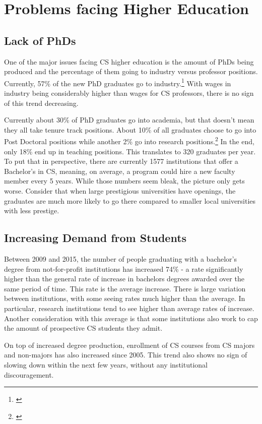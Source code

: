 \documentclass[12pt,twoside]{reedthesis}
\begin{document}
\section{Problems facing Higher Education}

\subsection{Lack of PhDs}
One of the major issues facing CS higher education is the amount of PhDs being produced and the percentage of them going to industry versus professor positions. Currently, 57\% of the new PhD graduates go to industry.\footnote{\cite{zweben_another_2018}} With wages in industry being considerably higher than wages for CS professors, there is no sign of this trend decreasing. 

Currently about 30\% of PhD graduates go into academia, but that doesn't mean they all take tenure track positions. About 10\% of all graduates choose to go into Post Doctoral positions while another 2\% go into research positions.\footnote{\cite{zweben_another_2018}} In the end, only 18\% end up in teaching positions. This translates to 320 graduates per year. To put that in perspective, there are currently 1577 institutions that offer a Bachelor's in CS, meaning, on average, a program could hire a new faculty member every 5 years. While those numbers seem bleak, the picture only gets worse. Consider that when large prestigious universities have openings, the graduates are much more likely to go there compared to smaller local universities with less prestige. 

\subsection{Increasing Demand from Students}
Between 2009 and 2015, the number of people graduating with a bachelor's degree from not-for-profit institutions has increased 74\% - a rate significantly higher than the general rate of increase in bachelors degrees awarded over the same period of time. This rate is the average increase. There is large variation between institutions, with some seeing rates much higher than the average. In particular, research institutions tend to see higher than average rates of increase. Another consideration with this average is that some institutions also work to cap the amount of prospective CS students they admit. 

On top of increased degree production, enrollment of CS courses from CS majors and non-majors has also increased since 2005. This trend also shows no sign of slowing down within the next few years, without any institutional discouragement. 
\end{document}
